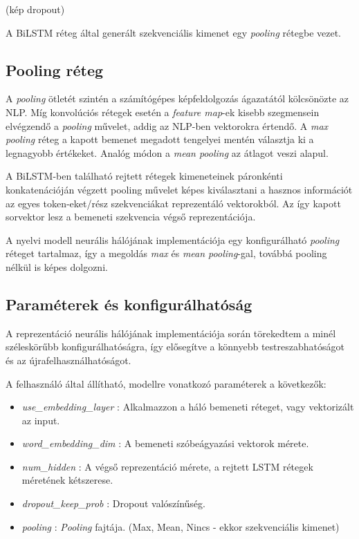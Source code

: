 (kép dropout)

A BiLSTM réteg által generált szekvenciális kimenet egy \textit{pooling} rétegbe vezet.

\subsection{Pooling réteg}

A \textit{pooling} ötletét szintén a számítógépes képfeldolgozás ágazatától kölcsönözte az NLP. Míg konvolúciós rétegek esetén a \textit{feature map}-ek kisebb szegmensein elvégzendő a \textit{pooling} művelet, addig az NLP-ben vektorokra értendő.
A \textit{max pooling} réteg a kapott bemenet megadott tengelyei mentén választja ki a legnagyobb értékeket. Analóg módon a \textit{mean pooling} az átlagot veszi alapul.

A BiLSTM-ben található rejtett rétegek kimeneteinek páronkénti konkatenációján végzett pooling művelet képes kiválasztani a hasznos információt az egyes token-eket/rész szekvenciákat reprezentáló vektorokból. Az így kapott sorvektor lesz a bemeneti szekvencia végső reprezentációja.

A nyelvi modell neurális hálójának implementációja egy konfigurálható \textit{pooling} réteget tartalmaz, így a megoldás \textit{max} és \textit{mean pooling}-gal, továbbá pooling nélkül is képes dolgozni.

\subsection{Paraméterek és konfigurálhatóság}

A reprezentáció neurális hálójának implementációja során törekedtem a minél széleskörűbb konfigurálhatóságra, így elősegítve a könnyebb testreszabhatóságot és az újrafelhasználhatóságot. 

A felhasználó által állítható, modellre vonatkozó paraméterek a következők:
\begin{itemize}
	\item \textit{use\_embedding\_layer} : Alkalmazzon a háló bemeneti réteget, vagy vektorizált az input.
	\item \textit{word\_embedding\_dim} : A bemeneti szóbeágyazási vektorok mérete.
	\item \textit{num\_hidden} : A végső reprezentáció mérete, a rejtett LSTM rétegek méretének kétszerese.
	\item \textit{dropout\_keep\_prob} : Dropout valószínűség.
	\item \textit{pooling} : \textit{Pooling} fajtája. (Max, Mean, Nincs - ekkor szekvenciális kimenet)	
\end{itemize}

